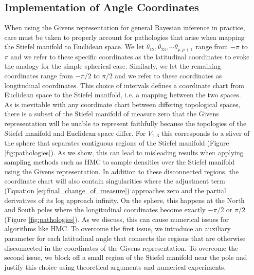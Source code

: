 \documentclass[ba]{imsart}
\numberwithin{equation}{section}
\theoremstyle{plain}
\begin{document}
\subsection{Implementation of Angle Coordinates}
When using the Givens representation for general Bayesian inference in practice, care must be taken to properly account for pathologies that arise when mapping the Stiefel manifold to Euclidean space. We let $\theta_{12}, \theta_{23}, \cdots \theta_{p,p+1}$ range from $-\pi$ to $\pi$ and we refer to these specific coordinates as the latitudinal coordinates to evoke the analogy for the simple spherical case. Similarly, we let the remaining coordinates range from $-\pi/2$ to $\pi/2$ and we refer to these coordinates as longitudinal coordinates. This choice of intervals defines a coordinate chart from Euclidean space to the Stiefel manifold, i.e. a mapping between the two spaces. As is inevitable with any coordinate chart between differing topological spaces, there is a subset of the Stiefel manifold of measure zero that the Givens representation will be unable to represent faithfully because the topologies of the Stiefel manifold and Euclidean space differ. For $V_{1,3}$ this corresponds to a sliver of the sphere that separates contiguous regions of the Stiefel manifold (Figure \ref{fig:pathologies}). As we show, this can lead to misleading results when applying sampling methods such as HMC to sample densities over the Stiefel manifold using the Givens representation. In addition to these disconnected regions, the coordinate chart will also contain singularities where the adjustment term (Equation \ref{eq:final_change_of_measure}) approaches zero and the partial derivatives of its log approach infinity. On the sphere, this happens at the North and South poles where the longitudinal coordinates become exactly $-\pi/2$ or $\pi/2$ (Figure \ref{fig:pathologies}). As we discuss, this can cause numerical issues for algorithms like HMC. To overcome the first issue, we introduce an auxiliary parameter for each latitudinal angle that connects the regions that are otherwise disconnected in the coordinates of the Givens representation. To overcome the second issue, we block off a small region of the Stiefel manifold near the pole and justify this choice using theoretical arguments and numerical experiments.
\end{document}
